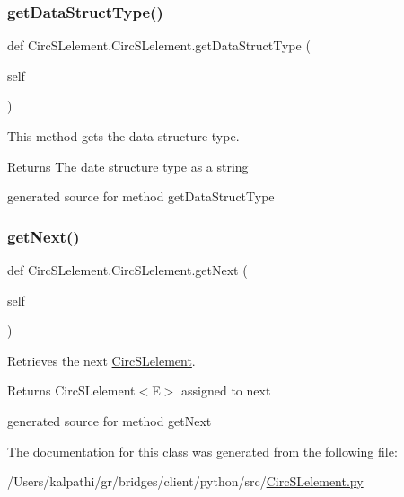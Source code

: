 \subsubsection{\texorpdfstring{get\+Data\+Struct\+Type()}{getDataStructType()}}
{\footnotesize\ttfamily def Circ\+S\+Lelement.\+Circ\+S\+Lelement.\+get\+Data\+Struct\+Type (\begin{DoxyParamCaption}\item[{}]{self }\end{DoxyParamCaption})}



This method gets the data structure type. 

\begin{DoxyReturn}{Returns}
The date structure type as a string\begin{DoxyVerb}generated source for method getDataStructType \end{DoxyVerb}
 
\end{DoxyReturn}
\hypertarget{class_circ_s_lelement_1_1_circ_s_lelement_a708c22a49e359026a8d01d5fa7e98dbf}{}\label{class_circ_s_lelement_1_1_circ_s_lelement_a708c22a49e359026a8d01d5fa7e98dbf} 
\subsubsection{\texorpdfstring{get\+Next()}{getNext()}}
{\footnotesize\ttfamily def Circ\+S\+Lelement.\+Circ\+S\+Lelement.\+get\+Next (\begin{DoxyParamCaption}\item[{}]{self }\end{DoxyParamCaption})}



Retrieves the next \hyperlink{class_circ_s_lelement_1_1_circ_s_lelement}{Circ\+S\+Lelement}. 

\begin{DoxyReturn}{Returns}
Circ\+S\+Lelement$<$\+E$>$ assigned to next\begin{DoxyVerb}generated source for method getNext \end{DoxyVerb}
 
\end{DoxyReturn}


The documentation for this class was generated from the following file\+:\begin{DoxyCompactItemize}
\item 
/\+Users/kalpathi/gr/bridges/client/python/src/\hyperlink{_circ_s_lelement_8py}{Circ\+S\+Lelement.\+py}\end{DoxyCompactItemize}
